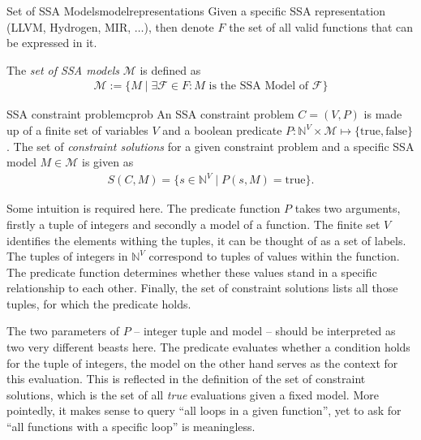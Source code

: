\begin{notation}{Set of SSA Models}{modelrepresentations}
    Given a specific SSA representation (LLVM, Hydrogen, MIR, $\dots$), then
    denote $F$ the set of all valid functions that can be expressed in it.

    The {\em set of SSA models} $\mathcal M$ is defined as
    \begin{align*}
        \mathcal M := \{M\mid\exists\mathcal F\in F\colon M
                        \text{ is the SSA Model of }\mathcal F\}
    \end{align*}
\end{notation}

\begin{definition}{SSA constraint problem}{cprob}
    An SSA constraint problem $C=(V,P)$ is made up of a finite set of variables
    $V$ and a boolean predicate
    $P\colon\mathbb N^V\times\mathcal M\mapsto\{\text{true}, \text{false}\}$.
    The set of {\em constraint solutions} for a given constraint problem and a
    specific SSA model $M\in\mathcal M$ is given as
    \begin{align*}
        S(C,M) = \{s\in\mathbb N^V\mid P(s,M)=\text{true}\}.
    \end{align*}
\end{definition}

    Some intuition is required here.
    The predicate function $P$ takes two arguments, firstly a tuple of integers
    and secondly a model of a function.
    The finite set $V$ identifies the elements withing the tuples, it can be
    thought of as a set of labels.
    The tuples of integers in $\mathbb N^V$ correspond to tuples of values
    within the function.
    The predicate function determines whether these values stand in a specific
    relationship to each other.
    Finally, the set of constraint solutions lists all those tuples, for which
    the predicate holds.

    The two parameters of $P$ -- integer tuple and model -- should be
    interpreted as two very different beasts here.
    The predicate evaluates whether a condition holds for the tuple of integers,
    the model on the other hand serves as the context for this evaluation.
    This is reflected in the definition of the set of constraint solutions,
    which is the set of all {\em true} evaluations given a fixed model.
    More pointedly, it makes sense to query ``all loops in a given function'',
    yet to ask for ``all functions with a specific loop'' is meaningless.

